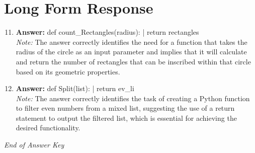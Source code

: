 \documentclass[12pt]{article}
\begin{document}
\section*{Long Form Response}
\begin{enumerate}[label=\arabic*.]
\setcounter{enumi}{10}
\item \textbf{Answer:} def count\_Rectangles(radius): | return rectangles
\\ \textit{Note:} The answer correctly identifies the need for a function that takes the radius of the circle as an input parameter and implies that it will calculate and return the number of rectangles that can be inscribed within that circle based on its geometric properties.
\item \textbf{Answer:} def Split(list): | return ev\_li
\\ \textit{Note:} The answer correctly identifies the task of creating a Python function to filter even numbers from a mixed list, suggesting the use of a return statement to output the filtered list, which is essential for achieving the desired functionality.
\end{enumerate}

\vfill
\noindent\textit{End of Answer Key}
\end{document}
